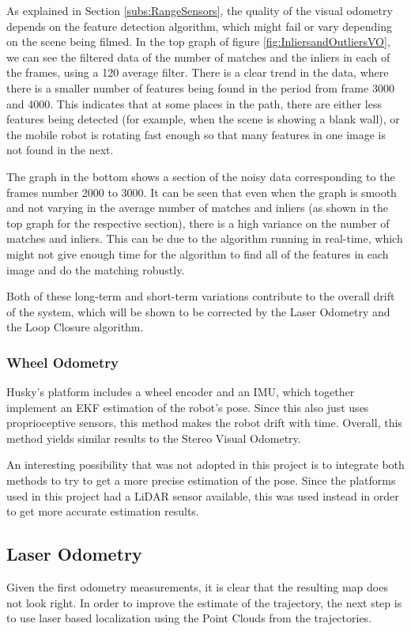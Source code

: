 \documentclass[11pt]{article}
\begin{document}
As explained in Section \ref{subs:RangeSensors}, the quality of the visual odometry depends on the feature detection algorithm, which might fail or vary depending on the scene being filmed. In the top graph of figure \ref{fig:InliersandOutliersVO}, we can see the filtered data of the number of matches and the inliers in each of the frames, using a 120 average filter. There is a clear trend in the data, where there is a smaller number of features being found in the period from frame 3000 and 4000. This indicates that at some places in the path, there are either less features being detected (for example, when the scene is showing a blank wall), or the mobile robot is rotating fast enough so that many features in one image is not found in the next.

The graph in the bottom shows a section of the noisy data corresponding to the frames number 2000 to 3000. It can be seen that even when the graph is smooth and not varying in the average number of matches and inliers (as shown in the top graph for the respective section), there is a high variance on the number of matches and inliers. This can be due to the algorithm running in real-time, which might not give enough time for the algorithm to find all of the features in each image and do the matching robustly.

Both of these long-term and short-term variations contribute to the overall drift of the system, which will be shown to be corrected by the Laser Odometry and the Loop Closure algorithm.




	
	
	\subsubsection*{Wheel Odometry}

Husky's platform includes a wheel encoder and an IMU, which together implement an EKF estimation of the robot's pose. Since this also just uses proprioceptive sensors, this method makes the robot drift with time. Overall, this method yields similar results to the Stereo Visual Odometry.

An interesting possibility that was not adopted in this project is to integrate both methods to try to get a more precise estimation of the pose. Since the platforms used in this project had a LiDAR sensor available, this was used instead in order to get more accurate estimation results.

	\subsection{Laser Odometry}
	\label{subs:LaserOd}
Given the first odometry measurements, it is clear that the resulting map does not look right. In order to improve the estimate of the trajectory, the next step is to use laser based localization using the Point Clouds from the trajectories.
	
\end{document}
